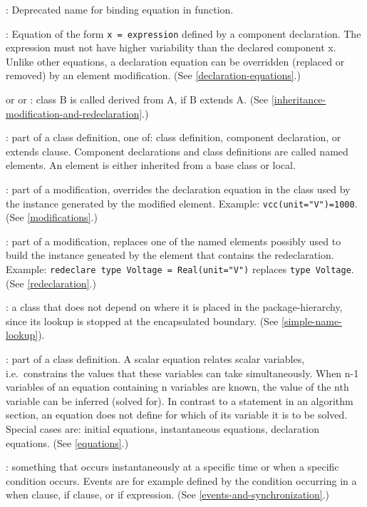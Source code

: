 : Deprecated name for binding equation in function.

: Equation of the form \lstinline!x = expression!
defined by a component declaration. The expression must not have higher
variability than the declared component x. Unlike other equations, a
declaration equation can be overridden (replaced or removed) by an
element modification. (See \cref{declaration-equations}.)

 or  or :
class B is called derived from A, if B extends A. (See \cref{inheritance-modification-and-redeclaration}.)

: part of a class definition, one of: class definition,
component declaration, or extends clause. Component declarations and
class definitions are called named elements. An element is either
inherited from a base class or local.

: part of a modification, overrides the
declaration equation in the class used by the instance generated by the
modified element. Example: \lstinline!vcc(unit="V")=1000!. (See \cref{modifications}.)

: part of a modification, replaces one of
the named elements possibly used to build the instance geneated by the
element that contains the redeclaration. Example: \lstinline!redeclare type Voltage = Real(unit="V")! replaces \lstinline!type Voltage!. (See \cref{redeclaration}.)

: a class that does not depend on where it is
placed in the package-hierarchy, since its lookup is stopped at the
encapsulated boundary. (See \cref{simple-name-lookup}).

: part of a class definition. A scalar equation relates
scalar variables, i.e.\ constrains the values that these variables can
take simultaneously. When n-1 variables of an equation containing n
variables are known, the value of the nth variable can be inferred
(solved for). In contrast to a statement in an algorithm section, an
equation does not define for which of its variable it is to be solved.
Special cases are: initial equations, instantaneous equations,
declaration equations. (See \cref{equations}.)

: something that occurs instantaneously at a specific time
or when a specific condition occurs. Events are for example defined by
the condition occurring in a when clause, if clause, or if expression.
(See \cref{events-and-synchronization}.)


